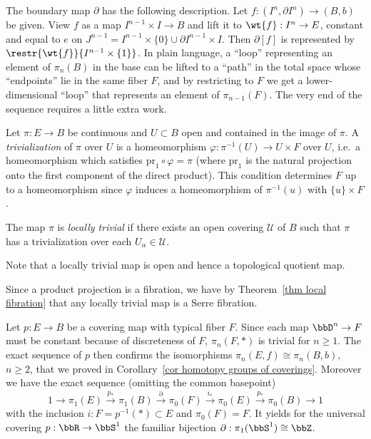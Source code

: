 The boundary map $\partial$ has the following description. Let $f:(I^n,\partial I^n)\to (B,b)$ be given. View $f$ as a map $I^{n-1}\times I\to B$ and lift it to $\wt{f}:I^n\to E$, constant and equal to $e$ on $J^{n-1}=I^{n-1}\times \{0\}\cup \partial I^{n-1}\times I$. Then $\partial[f]$ is represented by $\restr{\wt{f}}{I^{n-1}\times \{1\}}$. In plain language, a ``loop'' representing an element of $\pi_n(B)$ in the base can be lifted to a ``path'' in the total space whose ``endpoints'' lie in the same fiber $F$, and by restricting to $F$ we get a lower-dimensional ``loop'' that represents an element of $\pi_{n-1}(F)$. The very end of the sequence requires a little extra work.

\begin{defn}[Trivialization]
    Let $\pi :E\to B$ be continuous and $U\subset B$ open and contained in the image of $\pi$. A \emph{trivialization} of $\pi$ over $U$ is a homeomorphism $\varphi:\pi^{-1}(U)\to U\times F$ over $U$, i.e.\ a homeomorphism which satisfies $\mathrm{pr}_1\circ \varphi=\pi$ (where $\mathrm{pr}_1$ is the natural projection onto the first component of the direct product). This condition determines $F$ up to a homeomorphism since $\varphi$ induces a homeomorphism of $\pi^{-1}(u)$ with $\{u\}\times F$.
\end{defn}

\begin{defn}
    The map $\pi$ is \emph{locally trivial} if there exists an open covering $\mathcal{U}$ of $B$ such that $\pi$ has a trivialization over each $U_\alpha\in \mathcal{U}$. 
\end{defn}

Note that a locally trivial map is open and hence a topological quotient map.

\begin{example}
    Since a product projection is a fibration, we have by Theorem~\ref{thm local fibration} that any locally trivial map is a Serre fibration.
\end{example}
\begin{example}
    Let $p:E\to B$ be a covering map with typical fiber $F$. Since each map $\bbD^n\to F$ must be constant because of discreteness of $F$, $\pi_n(F,*)$ is trivial for $n\geq 1$. The exact sequence of $p$ then confirms the isomorphisms $\pi_n(E,f)\cong \pi_n(B,b)$, $n\geq 2$, that we proved in Corollary~\ref{cor homotopy groups of coverings}. Moreover we have the exact sequence (omitting the common basepoint)
    \[1\to \pi_1(E)\overset{p_\ast}{\to} \pi_1(B)\overset{\partial}{\to} \pi_0(F)\overset{i_\ast}{\to} \pi_0(E)\overset{p_\ast}{\to} \pi_0(B)\to 1\]
    with the inclusion $i:F=p^{-1}(*)\subset E$ and $\pi_0(F)=F$. It yields for the universal covering $p:\bbR \to \bbS^1$ the familiar bijection $\partial:\pi_1(\bbS^1)\cong \bbZ$.
\end{example}

